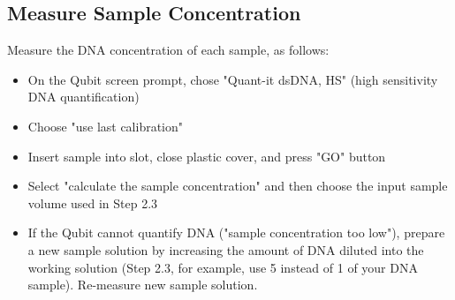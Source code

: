 \documentclass[letterpaper]{article}
\begin{document}
\subsection{Measure Sample Concentration}

Measure the DNA concentration of each sample, as follows:

\begin{itemize}
\item On the Qubit screen prompt, chose "Quant-it dsDNA, HS" (high sensitivity DNA quantification)
\item Choose "use last calibration"
\item Insert sample into slot, close plastic cover, and press "GO" button
\item Select "calculate the sample concentration" and then choose the input sample volume used in Step 2.3
\item If the Qubit cannot quantify DNA ("sample concentration too low"), prepare a new sample solution by increasing the amount of DNA diluted into the working solution (Step 2.3, for example, use \unit{5}{\micro\litre} instead of \unit{1}{\micro\litre} of your DNA sample). Re-measure new sample solution.
\end{itemize}
\end{document}

